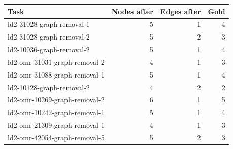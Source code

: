 \begin{tabularx}{\linewidth}{Xrrr}
\toprule
Task & Nodes after & Edges after & Gold\\\midrule
ld2-31028-graph-removal-1 & 5 & 1 & 4\\
ld2-31028-graph-removal-2 & 5 & 2 & 3\\
ld2-10036-graph-removal-2 & 5 & 1 & 4\\
ld2-omr-31031-graph-removal-2 & 4 & 1 & 3\\
ld2-omr-31088-graph-removal-1 & 5 & 1 & 4\\
ld2-10128-graph-removal-2 & 4 & 2 & 2\\
ld2-omr-10269-graph-removal-2 & 6 & 1 & 5\\
ld2-omr-10242-graph-removal-1 & 5 & 1 & 4\\
ld2-omr-21309-graph-removal-1 & 4 & 1 & 3\\
ld2-omr-42054-graph-removal-5 & 5 & 2 & 3\\
\bottomrule
\end{tabularx}
